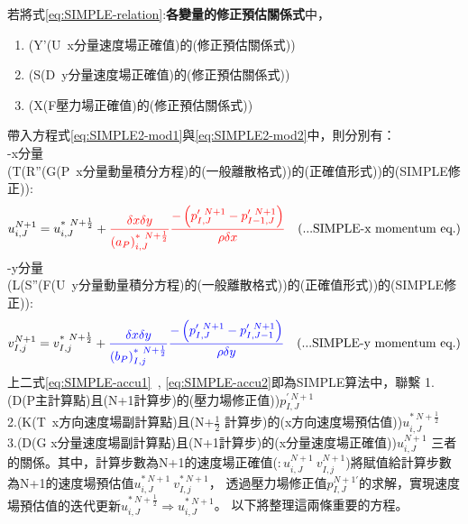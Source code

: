 \documentclass[12pt]{article}
\theoremstyle{upright}
\begin{document}
若將式\eqref{eq:SIMPLE-relation}:\textbf{各變量的修正預估關係式}中，
\begin{enumerate}
    \item(Y'(U\ x分量速度場正確值)的(修正預估關係式))
    \item(S(D\ y分量速度場正確值)的(修正預估關係式))
    \item(X(F壓力場正確值)的(修正預估關係式))
\end{enumerate}
帶入方程式\eqref{eq:SIMPLE2-mod1}與\eqref{eq:SIMPLE2-mod2}中，則分別有：\\
\noindent -x分量\\
\noindent (T(R''(G(P\ x分量動量積分方程)的(一般離散格式))的(正確值形式))的(SIMPLE修正)):
\begin{equation}\label{eq:SIMPLE-accu1}\begin{split}
    u_{i,J}^{N+1} = u_{i,J}^{*\ N+\frac{1}{2}} + {\color{red}\frac{\delta x\delta y}{(a_{P})_{i,J}^{*\ N+\frac{1}{2}}}\frac{-\left(p_{I,J}^{\prime\ N+1} - p_{I-1,J}^{\prime\ N+1}\right)}{\rho \delta x}} \quad \text{(...SIMPLE-x momentum eq.)}
\end{split}\end{equation}
\noindent -y分量\\
\noindent (L(S''(F(U\ y分量動量積分方程)的(一般離散格式))的(正確值形式))的(SIMPLE修正)):
\begin{equation}\label{eq:SIMPLE-accu2}\begin{split}
    v_{I,j}^{N+1} = v_{I,j}^{*\ N+\frac{1}{2}} + {\color{blue}\frac{\delta x\delta y}{(b_{P})_{I,j}^{*\ N+\frac{1}{2}}}\frac{-\left(p_{I,J}^{\prime\ N+1} - p_{I,J-1}^{\prime\ N+1}\right)}{\rho  \delta y}} \quad \text{(...SIMPLE-y momentum eq.)}
\end{split}\end{equation}
\noindent 上二式\eqref{eq:SIMPLE-accu1}\ , \eqref{eq:SIMPLE-accu2}即為SIMPLE算法中，聯繫
1.(D(P主計算點)且(N+1計算步)的(壓力場修正值))$p_{I,J}^{\prime\ N+1}$\\
2.(K(T\ x方向速度場副計算點)且(N+$\frac{1}{2}$ 計算步)的(x方向速度場預估值))$u_{i,J}^{*\ N+\frac{1}{2}}$\\
3.(D(G x分量速度場副計算點)且(N+1計算步)的(x分量速度場正確值))$u_{i,J}^{N+1}$
三者的關係。其中，計算步數為N+1的速度場正確值($:u_{i,J}^{N+1}\ v_{I,j}^{N+1}$)將賦值給計算步數為N+1的速度場預估值$u_{i,J}^{*\ N+1}\ v_{I,j}^{*\ N+1}$，
透過{\color{red}壓力場修正值$p_{I,J}^{N+1\prime}$}的求解，實現{\color{blue}速度場預估值的迭代更新$u_{i,J}^{*\ N+\frac{1}{2}} \Rightarrow u_{i,J}^{*\ N+1} $}。
\noindent 以下將整理這兩條重要的方程。\\
\end{document}
